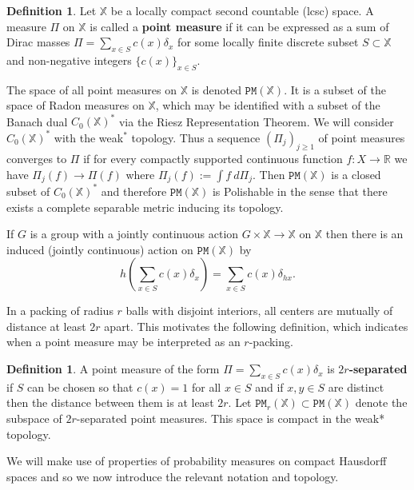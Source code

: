 \documentclass[11pt]{amsart}
\theoremstyle{definition}
\newtheorem{definition}[theorem]{Definition}
\theoremstyle{remark}
\newcommand{\R}{\mathbb{R}}
\newcommand{\bX}{\mathbb{X}}
\newcommand{\cP}{\mathtt{PM}}
\begin{document}
\begin{definition}
Let $\bX$ be a locally compact second countable (lcsc) space. A measure $\Pi$ on $\bX$ is called a {\bf point measure} if it can be expressed as a sum of Dirac masses $\Pi = \sum_{x\in S} c(x)\delta_x$ for some locally finite discrete subset $S\subset \bX$ and non-negative integers $\{c(x)\}_{x \in S}$. 

The space of all point measures on $\bX$ is denoted $\cP(\bX)$. It is a subset of the space of Radon measures on $\bX$, which may be identified with a subset of the Banach dual $C_0(\bX)^\ast$ via the Riesz Representation Theorem. We will consider $C_0(\bX)^\ast$ with the weak$^*$ topology. Thus a sequence $(\Pi_j)_{j \geq 1}$ of point measures converges to $\Pi$ if for every compactly supported continuous function $f:X \to \R$ we have $\Pi_j(f) \to \Pi(f)$ where $\Pi_j(f) :=\int f~d\Pi_j$. Then $\cP(\bX)$ is a closed subset of $C_0(\bX)^\ast$ and therefore $\cP(\bX)$ is Polishable in the sense that there exists a complete separable metric inducing its topology. 




If $G$ is a group with a jointly continuous action $G \times \bX \to \bX$ on $\bX$ then there is an induced (jointly continuous) action on $\cP(\bX)$ by 
$$h\left(\sum_{x\in S} c(x)\delta_x\right) = \sum_{x\in S} c(x)\delta_{hx}.$$ 
\end{definition}


In a packing of radius $r$ balls with disjoint interiors, all centers are mutually of distance at least $2r$ apart.  This motivates the following definition, which indicates when a point measure may be interpreted as an $r$-packing.

\begin{definition}
A point measure of the form $\Pi = \sum_{x\in S} c(x)\delta_x$ is {\bf $2r$-separated} if $S$ can be chosen so that $c(x)=1$ for all $x \in S$ and if $x,y \in S$ are distinct then the distance between them is at least $2r$. Let $\cP_r(\bX) \subset \cP(\bX)$ denote the subspace of $2r$-separated point measures. This space is compact in the weak* topology.
\end{definition}

We will make use of properties of probability measures on compact Hausdorff spaces and so we now introduce the relevant notation and topology.
\end{document}
